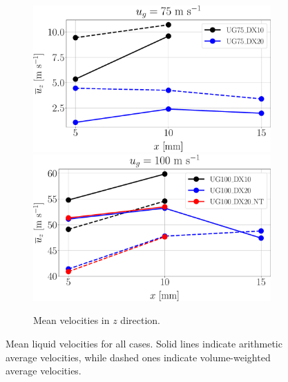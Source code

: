 \begin{figure}[ht]
\begin{subfigure}[b]{1.0\textwidth}
	\flushleft
   \includegraphics[scale=0.225]{./part2_developments/figures_ch5_resolved_JICF/SPRAY_characterization/velocities/ug75_uz_mean}
   \hfill
   \includegraphics[scale=0.225]{./part2_developments/figures_ch5_resolved_JICF/SPRAY_characterization/velocities/ug100_uz_mean}
	\caption{Mean velocities in $z$ direction.}
\end{subfigure}

   \caption[Sampled mean liquid velocities for all cases]{Mean liquid velocities for all cases. Solid lines indicate arithmetic average velocities, while dashed ones indicate volume-weighted average velocities.}
\label{fig:jicf_liquid_mean_velocities_with_x}
\end{figure}


